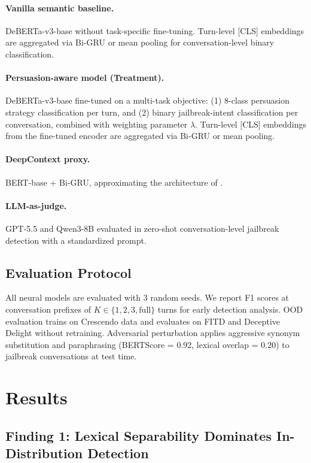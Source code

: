 \documentclass[11pt]{article}
\begin{document}
\paragraph{Vanilla semantic baseline.}
DeBERTa-v3-base \citep{he2021debertav3} without task-specific fine-tuning. Turn-level [CLS] embeddings are aggregated via Bi-GRU or mean pooling for conversation-level binary classification.

\paragraph{Persuasion-aware model (Treatment).}
DeBERTa-v3-base fine-tuned on a multi-task objective: (1) 8-class persuasion strategy classification per turn, and (2) binary jailbreak-intent classification per conversation, combined with weighting parameter $\lambda$. Turn-level [CLS] embeddings from the fine-tuned encoder are aggregated via Bi-GRU or mean pooling.

\paragraph{DeepContext proxy.}
BERT-base + Bi-GRU, approximating the architecture of \citet{su2026deepcontext}.

\paragraph{LLM-as-judge.}
GPT-5.5 and Qwen3-8B evaluated in zero-shot conversation-level jailbreak detection with a standardized prompt.

\subsection{Evaluation Protocol}

All neural models are evaluated with 3 random seeds. We report F1 scores at conversation prefixes of $K \in \{1, 2, 3, \text{full}\}$ turns for early detection analysis. OOD evaluation trains on Crescendo data and evaluates on FITD and Deceptive Delight without retraining. Adversarial perturbation applies aggressive synonym substitution and paraphrasing (BERTScore = 0.92, lexical overlap = 0.20) to jailbreak conversations at test time.

\section{Results}

\subsection{Finding 1: Lexical Separability Dominates In-Distribution Detection}
\end{document}
